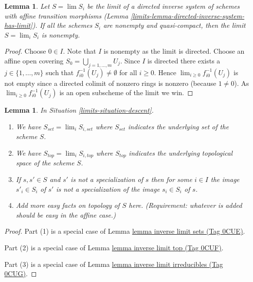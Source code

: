 \documentclass{amsart}
\theoremstyle{plain}
\newtheorem{lemma}[subsection]{Lemma}
\theoremstyle{definition}
\theoremstyle{remark}
\numberwithin{equation}{subsection}
\def\lim{\mathop{\mathrm{lim}}\nolimits}
\begin{document}
\begin{lemma}
\label{limits-lemma-limit-nonempty}
Let $S = \lim S_i$ be the limit of a directed inverse system
of schemes with affine transition morphisms
(Lemma \ref{limits-lemma-directed-inverse-system-has-limit}).
If all the schemes $S_i$ are nonempty and quasi-compact,
then the limit $S = \lim_i S_i$ is nonempty.
\end{lemma}

\begin{proof}
Choose $0 \in I$. Note that $I$ is nonempty as the limit is directed.
Choose an affine open covering $S_0 = \bigcup_{j = 1, \ldots, m} U_j$.
Since $I$ is directed there exists a $j \in \{1, \ldots, m\}$
such that $f_{i0}^{-1}(U_j) \not = \emptyset$ for all
$i \geq 0$. Hence $\lim_{i \geq 0} f_{i0}^{-1}(U_j)$ is not
empty since a directed colimit of nonzero rings is nonzero
(because $1 \not = 0$). As $\lim_{i \geq 0} f_{i0}^{-1}(U_j)$
is an open subscheme of the limit we win.
\end{proof}


\begin{lemma}
\label{limits-lemma-topology-limit}
In Situation \ref{limits-situation-descent}.
\begin{enumerate}
\item We have $S_{set} = \lim_i S_{i, set}$ where $S_{set}$
indicates the underlying set of the scheme $S$.
\item We have $S_{top} = \lim_i S_{i, top}$ where $S_{top}$
indicates the underlying topological space of the scheme $S$.
\item If $s, s' \in S$ and $s'$ is not a specialization of $s$
then for some $i \in I$ the image $s'_i \in S_i$ of $s'$ is not
a specialization of the image $s_i \in S_i$ of $s$.
\item Add more easy facts on topology of $S$ here.
(Requirement: whatever is added should be easy in the affine case.)
\end{enumerate}
\end{lemma}

\begin{proof}
Part (1) is a special case of Lemma \href{https://stacks.math.columbia.edu/tag/0CUE}{lemma inverse limit sets (Tag 0CUE)}.

\medskip\noindent
Part (2) is a special case of Lemma \href{https://stacks.math.columbia.edu/tag/0CUF}{lemma inverse limit top (Tag 0CUF)}.

\medskip\noindent
Part (3) is a special case of Lemma \href{https://stacks.math.columbia.edu/tag/0CUG}{lemma inverse limit irreducibles (Tag 0CUG)}.
\end{proof}
\end{document}
